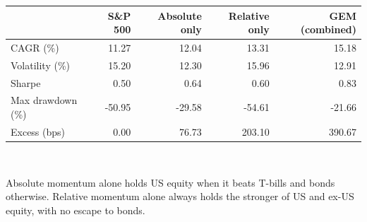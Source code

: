 \small
\begin{tabular}{lrrrr}
\toprule
  & \textbf{S\&P 500} & \textbf{Absolute only} & \textbf{Relative only} & \textbf{GEM (combined)} \\
\midrule
CAGR (\%) & 11.27 & 12.04 & 13.31 & 15.18 \\
Volatility (\%) & 15.20 & 12.30 & 15.96 & 12.91 \\
Sharpe & 0.50 & 0.64 & 0.60 & 0.83 \\
Max drawdown (\%) & -50.95 & -29.58 & -54.61 & -21.66 \\
Excess (bps) & 0.00 & 76.73 & 203.10 & 390.67 \\
\bottomrule
\end{tabular}
\\[0.4em]
\begin{minipage}{\linewidth}\footnotesize Absolute momentum alone holds US equity when it beats T-bills and bonds otherwise. Relative momentum alone always holds the stronger of US and ex-US equity, with no escape to bonds.\end{minipage}
